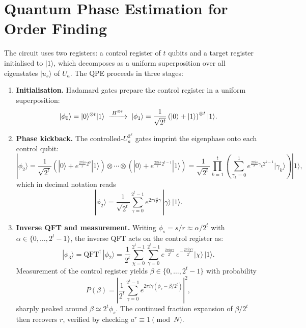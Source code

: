\documentclass[11pt,a4paper]{article}
\begin{document}
\section{Quantum Phase Estimation for Order Finding}
The circuit uses two registers: a control register of $t$ qubits and a target register 
initialised to $|1\rangle$, which decomposes as a uniform superposition over all eigenstates 
$|u_s\rangle$ of $U_a$. The QPE proceeds in three stages:

\begin{enumerate}[leftmargin=2em, itemsep=4pt]

  \item \textbf{Initialisation.} Hadamard gates prepare the control register in a uniform 
  superposition:
  \begin{equation}
    |\phi_0\rangle = |0\rangle^{\otimes t}|1\rangle 
    \;\xrightarrow{\;H^{\otimes t}\;}\; 
    |\phi_1\rangle = \frac{1}{\sqrt{2^t}} \left(\ket{0}+\ket{1}\right)^{\otimes t}|1\rangle.
  \end{equation}

  \item \textbf{Phase kickback.} The controlled-$U_a^{2^k}$ gates imprint the eigenphase 
  onto each control qubit:
  \begin{equation*}
    |\phi_2\rangle = \frac{1}{\sqrt{2^t}} 
    \left(|0\rangle + e^{\frac{2\pi i s}{r}2^0}|1\rangle\right) \otimes \cdots \otimes
    \left(|0\rangle + e^{\frac{2\pi i s}{r}2^{t-1}}|1\rangle\right)
    = \frac{1}{\sqrt{2^t}} \prod_{k=1}^{t} 
    \left(\sum_{\gamma_k=0}^{1}e^{\frac{2\pi i s}{r}\gamma_k 2^{k-1}}|\gamma_k\rangle\right)|1\rangle,
  \end{equation*}
  which in decimal notation reads
  \begin{equation}
    |\phi_2\rangle = \frac{1}{\sqrt{2^t}}\sum_{\gamma=0}^{2^t-1} 
    e^{2\pi i \frac{s}{r}\gamma}\,|\gamma\rangle\,|1\rangle.
  \end{equation}

  \item \textbf{Inverse QFT and measurement.} Writing $\phi_s = s/r \approx \alpha/2^t$ 
  with $\alpha \in \{0,\dots,2^t-1\}$, the inverse QFT acts on the control register as:
  \begin{equation}
    |\phi_3\rangle = \mathrm{QFT}^\dagger\,|\phi_2\rangle 
    = \frac{1}{2^t}\sum_{\chi=0}^{2^t-1}\sum_{\gamma=0}^{2^t-1}
    e^{\frac{2\pi i \alpha \gamma}{2^t}}\,e^{-\frac{2\pi i \chi \gamma}{2^t}}
    |\chi\rangle\,|1\rangle.
  \end{equation}
  Measurement of the control register yields $\beta \in \{0,\dots,2^t-1\}$ with probability
  \begin{equation}
    P(\beta) = \left|\frac{1}{2^t}\sum_{\gamma=0}^{2^t-1} 
    e^{2\pi i\gamma\left(\phi_s - \beta/2^t\right)}\right|^2,
  \end{equation}
  sharply peaked around $\beta \simeq 2^t\phi_s$. The continued fraction expansion of 
  $\beta/2^t$ then recovers $r$, verified by checking $a^r \equiv 1 \pmod{N}$.
\end{enumerate}
\end{document}

